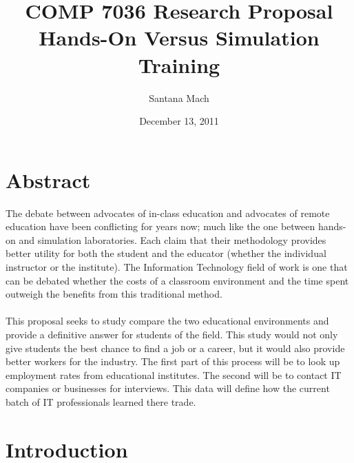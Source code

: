 \documentclass[titlepage]{article}
\begin{document}
\author{Santana Mach}
\title{COMP 7036 Research Proposal \\ Hands-On Versus Simulation Training}
\date{December 13, 2011}
\maketitle{}

\tableofcontents
\pagebreak
\onehalfspacing

\section{Abstract}
The debate between advocates of in-class education and advocates of remote education have
been conflicting for years now; much like the one between hands-on and simulation laboratories.
Each claim that their methodology provides better utility for both the student and the
educator (whether the individual instructor or the institute).  The Information Technology
field of work is one that can be debated whether the costs of a classroom environment
and the time spent outweigh the benefits from this traditional method.\\\\
This proposal seeks to study compare the two educational environments and provide a
definitive answer for students of the field.  This study would not only give students the
best chance to find a job or a career, but it would also provide better workers for the
industry.  The first part of this process will be to look up employment rates
from educational institutes.  The second will be to contact IT companies or businesses
for interviews.  This data will define how the current batch of IT professionals learned
there trade.

\section{Introduction}
\end{document}
